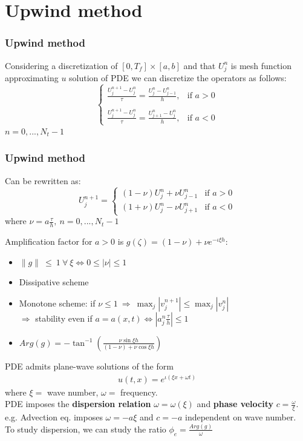 \documentclass{beamer}
\begin{document}
\section{Upwind method}
\begin{frame}
\frametitle{Upwind method}
Considering a discretization of $[0,T_f] \times [a,b]$ and that $U_j^n$ is mesh function approximating $u$ solution of PDE we can discretize the operators as follows:
\[
\begin{cases}
\displaystyle{\frac{U_j^{n+1} - U_j^n}{\tau} = \frac{U_j^n - U_{j-1}^n}{h}}, & \text{if } a > 0 \\ 
\\
\displaystyle{\frac{U_j^{n+1} - U_j^n}{\tau} = \frac{U_{j+1}^n - U_j^n}{h}}, & \text{if } a < 0
\end{cases}
\]
$n = 0, ..., N_t - 1$
\end{frame}
\begin{frame}
\frametitle{Upwind method}
Can be rewritten as:
\[
U_j^{n+1} =
\begin{cases}
(1 - \nu) U_j^n + \nu U_{j - 1}^n & \text{if } a > 0 \\
(1 + \nu) U_j^n - \nu U_{j + 1}^n & \text{if } a < 0
\end{cases}
\]
where $\nu = a \displaystyle{\frac{\tau}{h}}, \ n = 0, ..., N_t - 1$
\end{frame}
\begin{frame}
Amplification factor for $a > 0$ is $g(\zeta) = (1 - \nu) + \nu e^{-\iota \xi h}$:
\begin{itemize}
\setlength\itemsep{1em}
\item $ \|g\| \ \leq \ 1 \ \forall \ \xi \iff  0 \leq |\nu| \leq 1$
\item Dissipative scheme
\item Monotone scheme: if $\nu \leq 1 \ \Rightarrow \ \max_j{|v_j^{n+1}|} \leq \max_j{|v_j^n|}$
\\ $\Rightarrow$ stability even if $a = a(x,t) \iff |a_j^n \frac{\tau}{h}| \leq 1$
\item $Arg(g) = \displaystyle{-\tan^{-1}\left(\frac{\nu \sin{\xi h}}{(1 - \nu) + \nu \cos{\xi h}}\right)}$
\end{itemize}
\end{frame}
\begin{frame}
PDE admits plane-wave solutions of the form
\begin{align*}
u(t,x) = e^{\iota(\xi x + \omega t)}
\end{align*}
where $\xi = $ wave number, $\omega = $ frequency. \\
PDE imposes the \textbf{dispersion relation} $\omega = \omega(\xi)$ and \textbf{phase velocity} $c = \frac{\omega}{\xi}$. e.g. Advection eq. imposes $\omega = -a\xi$ and $c = -a$ independent on wave number. \\
To study dispersion, we can study the ratio $\phi_e = \frac{Arg(g)}{\omega}$
\end{frame}
\end{document}
